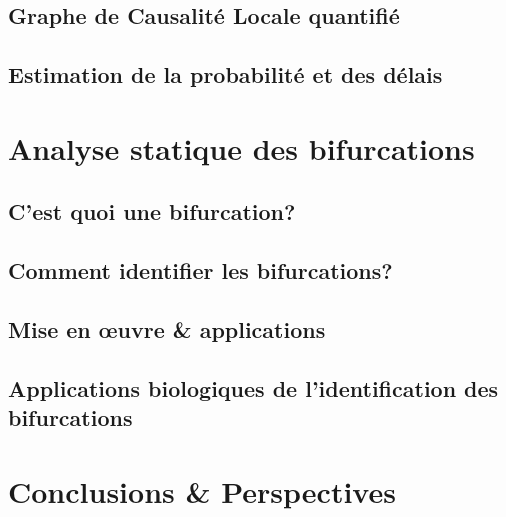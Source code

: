\documentclass[fleqn,10pt,c]{beamer}
\begin{document}
 \subsection{Graphe de Causalité Locale quantifié}
 \subsection{Estimation de la probabilité et des délais}
 
% 




 \section{Analyse statique des bifurcations}
 
 
 \subsection{C'est quoi une  bifurcation?}
 
 
 \subsection{Comment identifier les bifurcations?}
 
 
\subsection{Mise en {\oe}uvre \& applications}

\subsection{Applications biologiques de l'identification des bifurcations}
 
 
% 
%
 

% 
% 
\section{Conclusions \& Perspectives}
 
 
\end{document}
